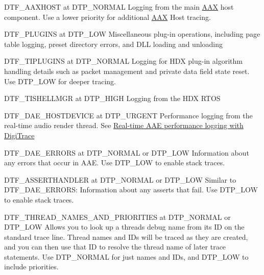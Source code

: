 \begin{DoxyItemize}
\item {\ttfamily D\+T\+F\+\_\+\+A\+A\+X\+H\+O\+S\+T} at {\ttfamily D\+T\+P\+\_\+\+N\+O\+R\+M\+A\+L} Logging from the main \hyperlink{a00288}{A\+A\+X} host component. Use a lower priority for additional \hyperlink{a00288}{A\+A\+X} Host tracing.  
\item {\ttfamily D\+T\+F\+\_\+\+P\+L\+U\+G\+I\+N\+S} at {\ttfamily D\+T\+P\+\_\+\+L\+O\+W} Miscellaneous plug-\/in operations, including page table logging, preset directory errors, and D\+L\+L loading and unloading  
\item {\ttfamily D\+T\+F\+\_\+\+T\+I\+P\+L\+U\+G\+I\+N\+S} at {\ttfamily D\+T\+P\+\_\+\+N\+O\+R\+M\+A\+L} Logging for H\+D\+X plug-\/in algorithm handling details such as packet management and private data field state reset. Use {\ttfamily D\+T\+P\+\_\+\+L\+O\+W} for deeper tracing.  
\item {\ttfamily D\+T\+F\+\_\+\+T\+I\+S\+H\+E\+L\+L\+M\+G\+R} at {\ttfamily D\+T\+P\+\_\+\+H\+I\+G\+H} Logging from the H\+D\+X R\+T\+O\+S  
\item {\ttfamily D\+T\+F\+\_\+\+D\+A\+E\+\_\+\+H\+O\+S\+T\+D\+E\+V\+I\+C\+E} at {\ttfamily D\+T\+P\+\_\+\+U\+R\+G\+E\+N\+T} Performance logging from the real-\/time audio render thread. See \hyperlink{a00364_digitrace__performancelogging}{Real-\/time A\+A\+E performance logging with Digi\+Trace}  
\item {\ttfamily D\+T\+F\+\_\+\+D\+A\+E\+\_\+\+E\+R\+R\+O\+R\+S} at {\ttfamily D\+T\+P\+\_\+\+N\+O\+R\+M\+A\+L} or {\ttfamily D\+T\+P\+\_\+\+L\+O\+W} Information about any errors that occur in A\+A\+E. Use {\ttfamily D\+T\+P\+\_\+\+L\+O\+W} to enable stack traces.   
\item {\ttfamily D\+T\+F\+\_\+\+A\+S\+S\+E\+R\+T\+H\+A\+N\+D\+L\+E\+R} at {\ttfamily D\+T\+P\+\_\+\+N\+O\+R\+M\+A\+L} or {\ttfamily D\+T\+P\+\_\+\+L\+O\+W} Similar to {\ttfamily D\+T\+F\+\_\+\+D\+A\+E\+\_\+\+E\+R\+R\+O\+R\+S}\+: Information about any asserts that fail. Use {\ttfamily D\+T\+P\+\_\+\+L\+O\+W} to enable stack traces.   
\item {\ttfamily D\+T\+F\+\_\+\+T\+H\+R\+E\+A\+D\+\_\+\+N\+A\+M\+E\+S\+\_\+\+A\+N\+D\+\_\+\+P\+R\+I\+O\+R\+I\+T\+I\+E\+S} at {\ttfamily D\+T\+P\+\_\+\+N\+O\+R\+M\+A\+L} or {\ttfamily D\+T\+P\+\_\+\+L\+O\+W} Allows you to look up a thread\textquotesingle{}s debug name from its I\+D on the standard trace line. Thread names and I\+Ds will be traced as they are created, and you can then use that I\+D to resolve the thread name of later trace statements. Use {\ttfamily D\+T\+P\+\_\+\+N\+O\+R\+M\+A\+L} for just names and I\+Ds, and {\ttfamily D\+T\+P\+\_\+\+L\+O\+W} to include priorities.   

\end{DoxyItemize}
